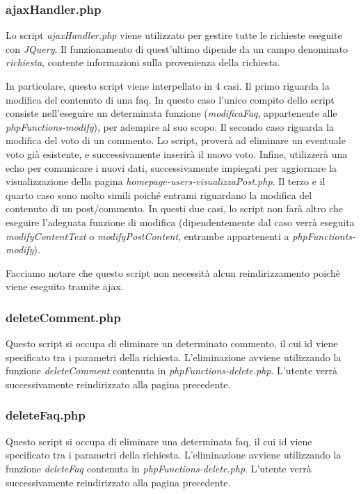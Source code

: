 \documentclass [a4paper,11pt]{book}
\begin{document}
\subsubsection{ajaxHandler.php}

Lo script \emph{ajaxHandler.php} viene utilizzato per gestire tutte le richieste eseguite con \emph{JQuery}. Il funzionamento di quest'ultimo dipende da un campo denominato \emph{richiesta}, contente informazioni sulla provenienza della richiesta.

In particolare, questo script viene interpellato in 4 casi. Il primo riguarda la modifica del contenuto di una faq. In questo caso l'unico compito dello script consiste nell'eseguire un determinata funzione (\emph{modificaFaq}, appartenente alle \emph{phpFunctions-modify}), per  adempire al suo scopo.
Il secondo caso riguarda la modifica del voto di un commento. Lo script, proverà ad eliminare un eventuale voto già esistente, e successivamente inserirà il nuovo voto. Infine, utilizzerà una echo per comunicare i nuovi dati, successivamente impiegati per aggiornare la visualizzazione della pagina \emph{homepage-users-visualizzaPost.php}.
Il terzo e il quarto caso sono molto simili poiché entrami riguardano la modifica del contenuto di un post/commento. In questi due casi, lo script non farà altro che eseguire l'adeguata funzione di modifica (dipendentemente dal caso verrà eseguita \emph{modifyContentText} o \emph{modifyPostContent}, entrambe appartenenti a \emph{phpFunctionts-modify}).

Facciamo notare che questo script non necessità alcun reindirizzamento poichè viene eseguito tramite ajax.
\medskip

\subsubsection{deleteComment.php}

Questo script si occupa di eliminare un determinato commento, il cui id viene specificato tra i parametri della richiesta. L'eliminazione avviene utilizzando la funzione \emph{deleteComment} contenuta in \emph{phpFunctions-delete.php}.
L'utente verrà successivamente reindirizzato alla pagina precedente.

\medskip

\subsubsection{deleteFaq.php}
Questo script si occupa di eliminare una determinata faq, il cui id viene specificato tra i parametri della richiesta. L'eliminazione avviene utilizzando la funzione \emph{deleteFaq} contenuta in \emph{phpFunctions-delete.php}.
L'utente verrà successivamente reindirizzato alla pagina precedente.
\end{document}
